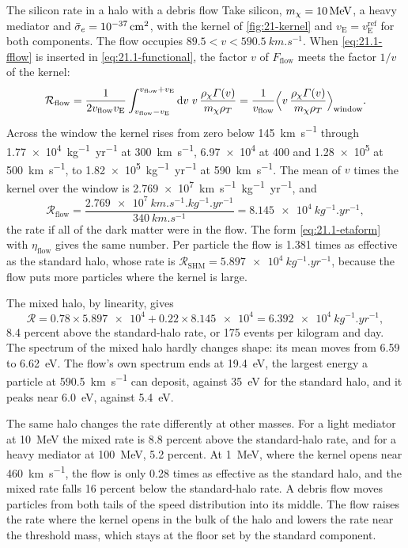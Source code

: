 \begin{workedexample}{The silicon rate in a halo with a debris flow}\label{we:21-debris}
Take silicon, $m_{\chi} = \SI{10}{MeV}$, a heavy mediator and $\bar{\sigma}_{e} = \SI{e-37}{cm^2}$, with the kernel of \cref{fig:21-kernel} and $v_{\mathrm{E}} = v_{\mathrm{E}}^{\mathrm{ref}}$ for both components. The flow occupies $89.5 < v < \SI{590.5}{km.s^{-1}}$. When \cref{eq:21.1-fflow} is inserted in \cref{eq:21.1-functional}, the factor $v$ of $F_{\mathrm{flow}}$ meets the factor $1/v$ of the kernel:
\begin{equation*}
  \mathcal{R}_{\mathrm{flow}} = \frac{1}{2v_{\mathrm{flow}}v_{\mathrm{E}}}\int_{v_{\mathrm{flow}} - v_{\mathrm{E}}}^{v_{\mathrm{flow}} + v_{\mathrm{E}}}\mathrm{d} v\;v\,\frac{\rho_\chi\varGamma(v)}{m_{\chi}\rho_T}
  = \frac{1}{v_{\mathrm{flow}}}\Bigl\langle v\,\frac{\rho_\chi\varGamma(v)}{m_{\chi}\rho_T}\Bigr\rangle_{\mathrm{window}} .
\end{equation*}
Across the window the kernel rises from zero below \SI{145}{km.s^{-1}} through \SI{1.77e4}{kg^{-1}.yr^{-1}} at \SI{300}{km.s^{-1}}, \num{6.97e4} at 400 and \num{1.28e5} at \SI{500}{km.s^{-1}}, to \SI{1.82e5}{kg^{-1}.yr^{-1}} at \SI{590}{km.s^{-1}}. The mean of $v$ times the kernel over the window is \SI{2.769e7}{km.s^{-1}.kg^{-1}.yr^{-1}}, and
\begin{equation*}
  \mathcal{R}_{\mathrm{flow}} = \frac{\SI{2.769e7}{km.s^{-1}.kg^{-1}.yr^{-1}}}{\SI{340}{km.s^{-1}}} = \SI{8.145e4}{kg^{-1}.yr^{-1}} ,
\end{equation*}
the rate if all of the dark matter were in the flow. The form \cref{eq:21.1-etaform} with $\eta_{\mathrm{flow}}$ gives the same number. Per particle the flow is 1.381 times as effective as the standard halo, whose rate is $\mathcal{R}_{\mathrm{SHM}} = \SI{5.897e4}{kg^{-1}.yr^{-1}}$, because the flow puts more particles where the kernel is large.

The mixed halo, by linearity, gives
\begin{equation*}
  \mathcal{R} = 0.78\times\num{5.897e4} + 0.22\times\num{8.145e4} = \SI{6.392e4}{kg^{-1}.yr^{-1}} ,
\end{equation*}
8.4 percent above the standard-halo rate, or 175 events per kilogram and day. The spectrum of the mixed halo hardly changes shape: its mean moves from 6.59 to \SI{6.62}{eV}. The flow's own spectrum ends at \SI{19.4}{eV}, the largest energy a particle at \SI{590.5}{km.s^{-1}} can deposit, against \SI{35}{eV} for the standard halo, and it peaks near \SI{6.0}{eV}, against \SI{5.4}{eV}.

The same halo changes the rate differently at other masses. For a light mediator at \SI{10}{MeV} the mixed rate is 8.8 percent above the standard-halo rate, and for a heavy mediator at \SI{100}{MeV}, 5.2 percent. At \SI{1}{MeV}, where the kernel opens near \SI{460}{km.s^{-1}}, the flow is only 0.28 times as effective as the standard halo, and the mixed rate falls 16 percent below the standard-halo rate. A debris flow moves particles from both tails of the speed distribution into its middle. The flow raises the rate where the kernel opens in the bulk of the halo and lowers the rate near the threshold mass, which stays at the floor set by the standard component.
\end{workedexample}

